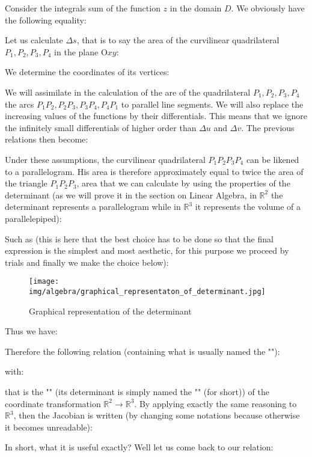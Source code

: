 	Consider the integrals sum of the function $z$ in the domain $D$. We obviously have the following equality:
	
	Let us calculate $\Delta s$, that is to say the area of the curvilinear quadrilateral $P_1,P_2,P_3,P_4$ in the plane $\text{O}xy$:
	
	We determine the coordinates of its vertices:
	
	
	We will assimilate in the calculation of the are of the quadrilateral  $P_1,P_2,P_3,P_4$ the arcs $P_1P_2,P_2P_3,P_3P_4,P_4P_1$ to parallel line segments. We will also replace the increasing values of the functions by their differentials. This means that we ignore the infinitely small differentials of higher order than $\Delta u$ and $\Delta v$. The previous relations then become:
	

	Under these assumptions, the curvilinear quadrilateral $P_1P_2P_3P_4$ can be likened to a parallelogram. His area is therefore approximately equal to twice the area of the triangle $P_1P_2P_3$, area that we can calculate by using the properties of the determinant (as we will prove it in the section on Linear Algebra, in $\mathbb{R}^2$ the determinant  represents a parallelogram while in $\mathbb{R}^3$ it represents the volume of a parallelepiped):
	
	Such as (this is here that the best choice has to be done so that the final expression is the simplest and most aesthetic, for this purpose we proceed by trials and finally we make the choice below):
	\begin{figure}[H]
		\centering
		\texttt{[image: img/algebra/graphical\_representaton\_of\_determinant.jpg]}
		\caption{Graphical representation of the determinant}
	\end{figure}

	Thus we have:
	
	Therefore the following relation (containing what is usually named the ""):
	
	with:
	
	that is the "" (its determinant is simply named the "" (for short)) of the coordinate transformation $\mathbb{R}^2 \rightarrow \mathbb{R}^3$. By applying exactly the same reasoning to $\mathbb{R}^3$, then the Jacobian is written (by changing some notations because otherwise it becomes unreadable):
	
	In short, what it is useful exactly? Well let us come back to our relation:
	

